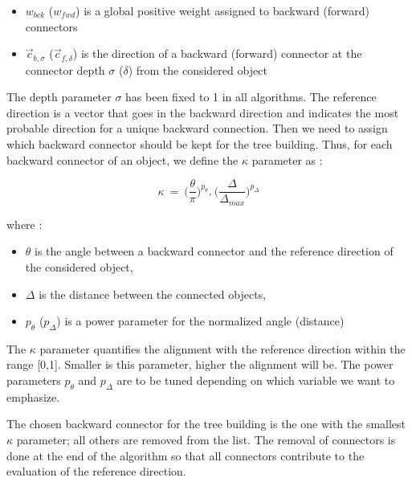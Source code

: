 \documentclass[12pt]{article}
\begin{document}
\begin{itemize}
  \item $w_{bck}$ ($w_{fwd}$) is a global positive weight assigned to backward (forward) connectors
  \item $\vec{c}_{b,\sigma}$ ($\vec{c}_{f,\delta}$) is the direction of a backward (forward) connector at the connector depth $\sigma$ ($\delta$) from the considered object
\end{itemize}

The depth parameter $\sigma$ has been fixed to 1 in all algorithms. The reference direction is a vector that goes in the backward direction and indicates the most probable direction for a unique backward connection. Then we need to assign which backward connector should be kept for the tree building. Thus, for each backward connector of an object, we define the $\kappa$ parameter as :

\begin{equation}
  \kappa~=~\Big(\frac{\theta}{\pi}\Big)^{p_{\theta}} . ~\Big(\frac{\Delta}{\Delta_{max}}\Big)^{p_{\Delta}} 
\end{equation}

where :

\begin{itemize}
  \item $\theta$ is the angle between a backward connector and the reference direction of the considered object,
  \item $\Delta$ is the distance between the connected objects,
  \item $p_{\theta}$ ($p_{\Delta}$) is a power parameter for the normalized angle (distance)
\end{itemize}

The $\kappa$ parameter quantifies the alignment with the reference direction within the range [0,1]. Smaller is this parameter, higher the alignment will be. The power parameters $p_{\theta}$ and $p_{\Delta}$ are to be tuned depending on which variable we want to emphasize.

The chosen backward connector for the tree building is the one with the smallest $\kappa$ parameter; all others are removed from the list. The removal of connectors is done at the end of the algorithm so that all connectors contribute to the evaluation of the reference direction.
\end{document}
